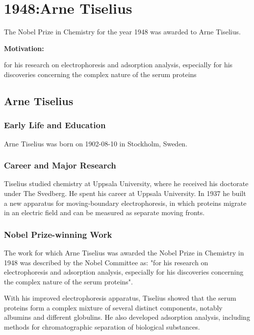 \chapter{1948:Arne Tiselius}

\label{chap:chemistry1948}

The Nobel Prize in Chemistry for the year 1948 was awarded to Arne Tiselius.

\textbf{Motivation:}

for his research on electrophoresis and adsorption analysis, especially for his discoveries concerning the complex nature of the serum proteins

\section{Arne Tiselius}

\subsection*{Early Life and Education}

Arne Tiselius was born on 1902-08-10 in Stockholm, Sweden.

\subsection*{Career and Major Research}

Tiselius studied chemistry at Uppsala University, where he received his doctorate under The Svedberg. He spent his career at Uppsala University. In 1937 he built a new apparatus for moving-boundary electrophoresis, in which proteins migrate in an electric field and can be measured as separate moving fronts.

\subsection*{Nobel Prize-winning Work}

The work for which Arne Tiselius was awarded the Nobel Prize in Chemistry in 1948 was described by the Nobel Committee as: "for his research on electrophoresis and adsorption analysis, especially for his discoveries concerning the complex nature of the serum proteins".

With his improved electrophoresis apparatus, Tiselius showed that the serum proteins form a complex mixture of several distinct components, notably albumins and different globulins. He also developed adsorption analysis, including methods for chromatographic separation of biological substances.

